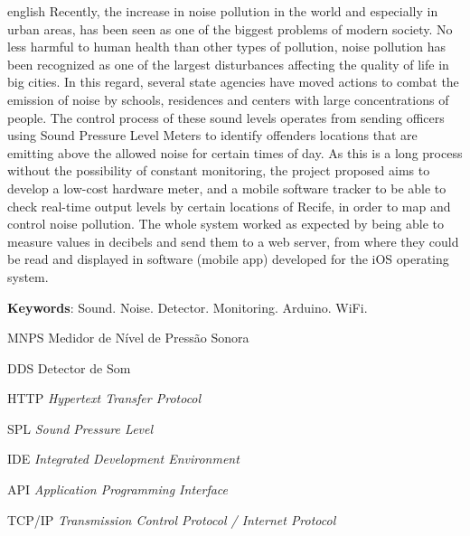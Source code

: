 \documentclass[
    12pt,               %
    openright,          %
    oneside,
    a4paper,            
    english,            %
    brazil              %
    ]{abntex2}
\begin{document}
\begin{resumo}[Abstract]
 \begin{otherlanguage*}{english}
   Recently, the increase in noise pollution in the world and especially in urban areas, has been seen as one of the biggest problems of modern society. No less harmful to human health than other types of pollution, noise pollution has been recognized as one of the largest disturbances affecting the quality of life in big cities. In this regard, several state agencies have moved actions to combat the emission of noise by schools, residences and centers with large concentrations of people. The control process of these sound levels operates from sending officers using Sound Pressure Level Meters to identify offenders locations that are emitting above the allowed noise for certain times of day. As this is a long process without the possibility of constant monitoring, the project proposed aims to develop a low-cost hardware meter, and a mobile software tracker to be able to check real-time output levels by certain locations of Recife, in order to map and control noise pollution. The whole system worked as expected by being able to measure values in decibels and send them to a web server, from where they could be read and displayed in software (mobile app) developed for the iOS operating system.

   \vspace{\onelineskip}
 
   \noindent 
   \textbf{Keywords}: Sound. Noise. Detector. Monitoring. Arduino. WiFi.
 \end{otherlanguage*}
\end{resumo}

\listoffigures*
\cleardoublepage

\listoftables*
\cleardoublepage

\begin{siglas}
  \item[MNPS] Medidor de Nível de Pressão Sonora
  \item[DDS] Detector de Som
  \item[HTTP] \textit{Hypertext Transfer Protocol}
  \item[SPL] \textit{Sound Pressure Level}
  \item [IDE] \textit{Integrated Development Environment}
  \item [API] \textit{Application Programming Interface}
  \item [TCP/IP] \textit{Transmission Control Protocol / Internet Protocol}
\end{siglas}
\end{document}
